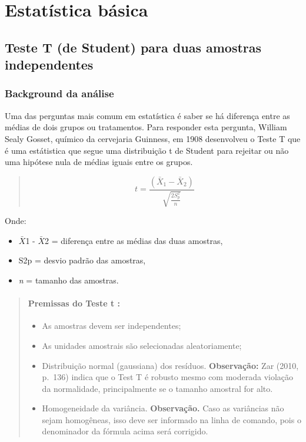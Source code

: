 \documentclass[
]{book}
\providecommand{\tightlist}{%
  \setlength{\itemsep}{0pt}\setlength{\parskip}{0pt}}
\begin{document}
\hypertarget{estatuxedstica-buxe1sica}{%
\chapter{Estatística básica}\label{estatuxedstica-buxe1sica}}

\hypertarget{teste-t-de-student-para-duas-amostras-independentes}{%
\section{Teste T (de Student) para duas amostras independentes}\label{teste-t-de-student-para-duas-amostras-independentes}}

\hypertarget{background-da-anuxe1lise}{%
\subsection{Background da análise}\label{background-da-anuxe1lise}}

Uma das perguntas mais comum em estatística é saber se há diferença entre as médias de dois grupos ou tratamentos. Para responder esta pergunta, William Sealy Gosset, químico da cervejaria Guinness, em 1908 desenvolveu o Teste T que é uma estátistica que segue uma distribuição t de Student para rejeitar ou não uma hipótese nula de médias iguais entre os grupos.

\begin{quote}
\[ t = \frac{(\bar{X}_1 - \bar{X}_2)}{\sqrt{\frac{2S^2_p}{n}}}\]
\end{quote}

Onde:

\begin{itemize}
\item
  \(\bar{X}\)1 - \(\bar{X}\)2 = diferença entre as médias das duas amostras,
\item
  S2p = desvio padrão das amostras,
\item
  \emph{n} = tamanho das amostras.
\end{itemize}

\begin{quote}
\hypertarget{premissas-do-teste-t}{%
\subsubsection{Premissas do Teste t :}\label{premissas-do-teste-t}}

\begin{itemize}
\tightlist
\item
  As amostras devem ser independentes;
\item
  As unidades amostrais são selecionadas aleatoriamente;
\item
  Distribuição normal (gaussiana) dos resíduos. \textbf{Observação:} Zar (2010, p.~136) indica que o Test T é robusto mesmo com moderada violação da normalidade, principalmente se o tamanho amostral for alto.
\item
  Homogeneidade da variância. \textbf{Observação.} Caso as variâncias não sejam homogêneas, isso deve ser informado na linha de comando, pois o denominador da fórmula acima será corrigido.
\end{itemize}
\end{quote}
\end{document}
